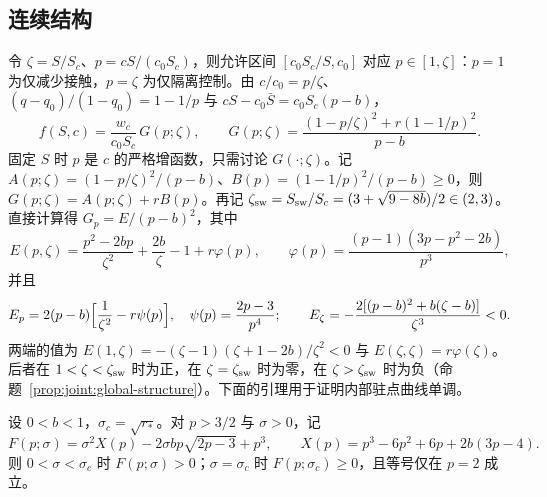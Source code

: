 \subsection{连续结构}
\label{sec:proof:cost-structure}
令 $\zeta=S/S_c$、$p=cS/(c_0S_c)$，则允许区间 $[c_0S_c/S,c_0]$ 对应 $p\in[1,\zeta]$：$p=1$ 为仅减少接触，$p=\zeta$ 为仅隔离控制。由 $c/c_0=p/\zeta$、$(q-q_0)/(1-q_0)=1-1/p$ 与 $cS-c_0\bar S=c_0S_c(p-b)$，
\[
f(S,c)=\frac{w_c}{c_0S_c}\,G(p;\zeta),\qquad
G(p;\zeta)=\frac{(1-p/\zeta)^2+r(1-1/p)^2}{p-b}.
\]
固定 $S$ 时 $p$ 是 $c$ 的严格增函数，只需讨论 $G(\cdot;\zeta)$。记 $A(p;\zeta)=(1-p/\zeta)^2/(p-b)$、$B(p)=(1-1/p)^2/(p-b)\ge0$，则 $G(p;\zeta)=A(p;\zeta)+rB(p)$。再记 $\zeta_{\rm sw}=S_{\rm sw}/S_c=(3+\sqrt{9-8b})/2\in(2,3)$。直接计算得 $G_p=E/(p-b)^2$，其中
\[
E(p,\zeta)=\frac{p^2-2bp}{\zeta^2}+\frac{2b}{\zeta}-1+r\varphi(p),\qquad
\varphi(p)=\frac{(p-1)(3p-p^2-2b)}{p^3},
\]
并且
\begin{equation}
E_p=2(p-b)\Bigl[\frac1{\zeta^2}-r\psi(p)\Bigr],\quad
\psi(p)=\frac{2p-3}{p^4};\qquad
E_\zeta=-\frac{2[(p-b)^2+b(\zeta-b)]}{\zeta^3}<0.
\label{eq:proof:cost-E}
\end{equation}
两端的值为 $E(1,\zeta)=-(\zeta-1)(\zeta+1-2b)/\zeta^2<0$ 与 $E(\zeta,\zeta)=r\varphi(\zeta)$。后者在 $1<\zeta<\zeta_{\rm sw}$ 时为正，在 $\zeta=\zeta_{\rm sw}$ 时为零，在 $\zeta>\zeta_{\rm sw}$ 时为负（命题~\ref{prop:joint:global-structure}）。下面的引理用于证明内部驻点曲线单调。
\begin{lemma}
\label{lem:proof:fold-free}
设 $0<b<1$，$\sigma_c=\sqrt{r_*}$。对 $p>3/2$ 与 $\sigma>0$，记
\[
F(p;\sigma)=\sigma^2X(p)-2\sigma bp\sqrt{2p-3}+p^3,\qquad X(p)=p^3-6p^2+6p+2b(3p-4).
\]
则 $0<\sigma<\sigma_c$ 时 $F(p;\sigma)>0$；$\sigma=\sigma_c$ 时 $F(p;\sigma_c)\ge0$，且等号仅在 $p=2$ 成立。
\end{lemma}

